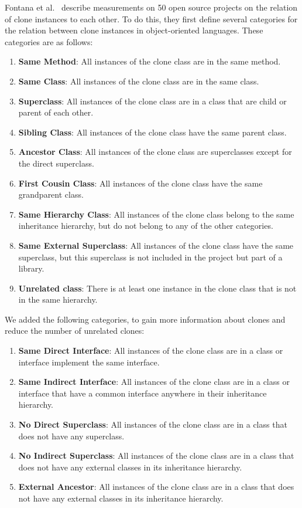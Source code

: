 Fontana et al.~\cite{fontana2015duplicated} describe measurements on 50 open source projects on the relation of clone instances to each other. To do this, they first define several categories for the relation between clone instances in object-oriented languages. These categories are as follows:
\begin{enumerate}
  \item \textbf{Same Method}: All instances of the clone class are in the same method.
  \item \textbf{Same Class}: All instances of the clone class are in the same class.
  \item \textbf{Superclass}: All instances of the clone class are in a class that are child or parent of each other.
  \item \textbf{Sibling Class}: All instances of the clone class have the same parent class.
    \item \textbf{Ancestor Class}: All instances of the clone class are superclasses except for the direct superclass.
  \item \textbf{First Cousin Class}: All instances of the clone class have the same grandparent class.
\item \textbf{Same Hierarchy Class}: All instances of the clone class belong to the same inheritance hierarchy, but do not belong to any of the other categories.
\item \textbf{Same External Superclass}: All instances of the clone class have the same superclass, but this superclass is not included in the project but part of a library.
\item \textbf{Unrelated class}: There is at least one instance in the clone class that is not in the same hierarchy.
\end{enumerate}

We added the following categories, to gain more information about clones and reduce the number of unrelated clones:

\begin{enumerate}
\item \textbf{Same Direct Interface}: All instances of the clone class are in a class or interface implement the same interface.
\item \textbf{Same Indirect Interface}: All instances of the clone class are in a class or interface that have a common interface anywhere in their inheritance hierarchy.
\item \textbf{No Direct Superclass}: All instances of the clone class are in a class that does not have any superclass.
\item \textbf{No Indirect Superclass}: All instances of the clone class are in a class that does not have any external classes in its inheritance hierarchy.
\item \textbf{External Ancestor}: All instances of the clone class are in a class that does not have any external classes in its inheritance hierarchy.
\end{enumerate}

